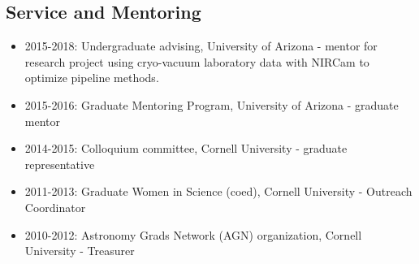 \documentclass[11pt, oneside]{article}   	%
\begin{document}
\subsection*{Service and Mentoring}
\begin{itemize}[noitemsep]
    \item 2015-2018: Undergraduate advising, University of Arizona - mentor for research project using cryo-vacuum laboratory data with NIRCam to optimize pipeline methods.
    \item 2015-2016: Graduate Mentoring Program, University of Arizona - graduate mentor
    \item 2014-2015: Colloquium committee, Cornell University - graduate representative
    \item 2011-2013: Graduate Women in Science (coed), Cornell University - Outreach Coordinator
    \item2010-2012: Astronomy Grads Network (AGN) organization, Cornell University - Treasurer
\end{itemize}


\end{document}
